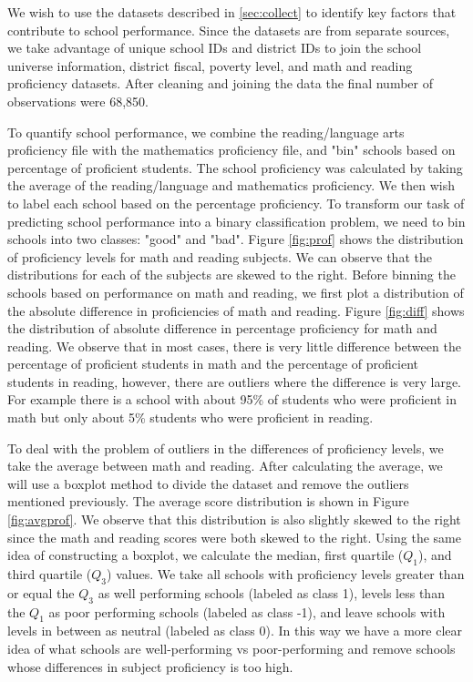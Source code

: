 We wish to use the datasets described in \ref{sec:collect} to identify key factors that contribute to school performance. Since the datasets are from separate sources, we take advantage of unique school IDs and district IDs to join the school universe information, district fiscal, poverty level, and math and reading proficiency datasets. After cleaning and joining the data the final number of observations were 68,850.

To quantify school performance, we combine the reading/language arts proficiency file with the mathematics proficiency file, and "bin" schools based on percentage of proficient students. The school proficiency was calculated by taking the average of the reading/language and mathematics proficiency. We then wish to label each school based on the percentage proficiency. To transform our task of predicting school performance into a binary classification problem, we need to bin schools into two classes: "good" and "bad". Figure \ref{fig:prof} shows the distribution of proficiency levels for math and reading subjects. We can observe that the distributions for each of the subjects are skewed to the right. Before binning the schools based on performance on math and reading, we first plot a distribution of the absolute difference in proficiencies of math and reading. Figure \ref{fig:diff} shows the distribution of absolute difference in percentage proficiency for math and reading. We observe that in most cases, there is very little difference between the percentage of proficient students in math and the percentage of proficient students in reading, however, there are outliers where the difference is very large. For example there is a school with about 95\% of students who were proficient in math but only about 5\% students who were proficient in reading.

To deal with the problem of outliers in the differences of proficiency levels, we take the average between math and reading. After calculating the average, we will use a boxplot method to divide the dataset and remove the outliers mentioned previously. The average score distribution is shown in Figure \ref{fig:avgprof}. We observe that this distribution is also slightly skewed to the right since the math and reading scores were both skewed to the right. Using the same idea of constructing a boxplot, we calculate the median, first quartile ($Q_1$), and third quartile ($Q_3$) values. We take all schools with proficiency levels greater than or equal the $Q_3$ as well performing schools (labeled as class 1), levels less than the $Q_1$ as poor performing schools (labeled as class -1), and leave schools with levels in between as neutral (labeled as class 0). In this way we have a more clear idea of what schools are well-performing vs poor-performing and remove schools whose differences in subject proficiency is too high.

